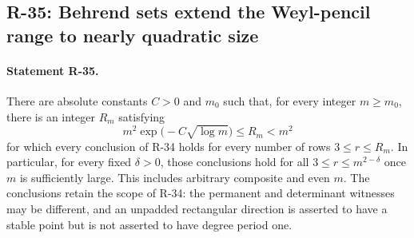 \subsection{R-35: Behrend sets extend the Weyl-pencil range to nearly quadratic size}

\paragraph{Statement R-35.}
There are absolute constants $C>0$ and $m_0$ such that, for every
integer $m\geq m_0$, there is an integer $R_m$ satisfying
\[
 m^2\exp\!\bigl(-C\sqrt{\log m}\bigr)\leq R_m<m^2
\]
for which every conclusion of R-34 holds for every number of rows
$3\leq r\leq R_m$. In particular, for every fixed $\delta>0$, those
conclusions hold for all $3\leq r\leq m^{2-\delta}$ once $m$ is
sufficiently large. This includes arbitrary composite and even $m$.
The conclusions retain the scope of R-34: the permanent and determinant
witnesses may be different, and an unpadded rectangular direction is
asserted to have a stable point but is not asserted to have degree
period one.

